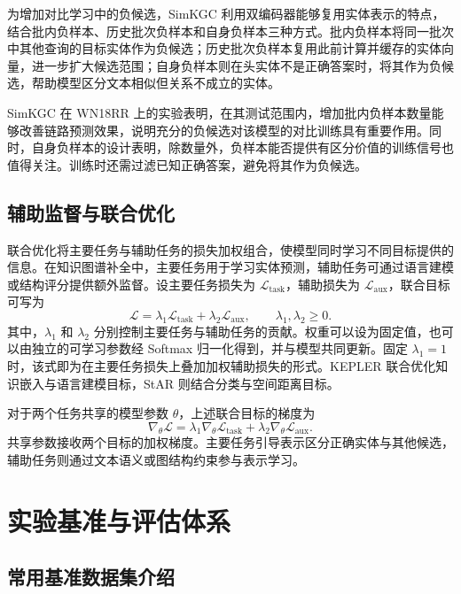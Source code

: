 为增加对比学习中的负候选，SimKGC 利用双编码器能够复用实体表示的特点，结合批内负样本、历史批次负样本和自身负样本三种方式\cite{wang2022simkgc}。批内负样本将同一批次中其他查询的目标实体作为负候选；历史批次负样本复用此前计算并缓存的实体向量，进一步扩大候选范围；自身负样本则在头实体不是正确答案时，将其作为负候选，帮助模型区分文本相似但关系不成立的实体。

SimKGC 在 WN18RR 上的实验表明，在其测试范围内，增加批内负样本数量能够改善链路预测效果，说明充分的负候选对该模型的对比训练具有重要作用。同时，自身负样本的设计表明，除数量外，负样本能否提供有区分价值的训练信号也值得关注。训练时还需过滤已知正确答案，避免将其作为负候选。

\subsection{辅助监督与联合优化}

联合优化将主要任务与辅助任务的损失加权组合，使模型同时学习不同目标提供的信息。在知识图谱补全中，主要任务用于学习实体预测，辅助任务可通过语言建模或结构评分提供额外监督。设主要任务损失为 $\mathcal{L}_{\mathrm{task}}$，辅助损失为 $\mathcal{L}_{\mathrm{aux}}$，联合目标可写为
\begin{equation}
    \mathcal{L}=\lambda_1\mathcal{L}_{\mathrm{task}}
        +\lambda_2\mathcal{L}_{\mathrm{aux}},
    \qquad\lambda_1,\lambda_2\geq0.
    \label{eq:bg_joint_loss}
\end{equation}
其中，$\lambda_1$ 和 $\lambda_2$ 分别控制主要任务与辅助任务的贡献。权重可以设为固定值，也可以由独立的可学习参数经 Softmax 归一化得到，并与模型共同更新。固定 $\lambda_1=1$ 时，该式即为在主要任务损失上叠加加权辅助损失的形式。KEPLER 联合优化知识嵌入与语言建模目标，StAR 则结合分类与空间距离目标\cite{wang2021kepler,wang2021structure}。

对于两个任务共享的模型参数 $\theta$，上述联合目标的梯度为
\begin{equation}
    \nabla_{\theta}\mathcal{L}
    =\lambda_1\nabla_{\theta}\mathcal{L}_{\mathrm{task}}
      +\lambda_2\nabla_{\theta}\mathcal{L}_{\mathrm{aux}}.
\end{equation}
共享参数接收两个目标的加权梯度。主要任务引导表示区分正确实体与其他候选，辅助任务则通过文本语义或图结构约束参与表示学习。

\section{实验基准与评估体系}

\subsection{常用基准数据集介绍}

